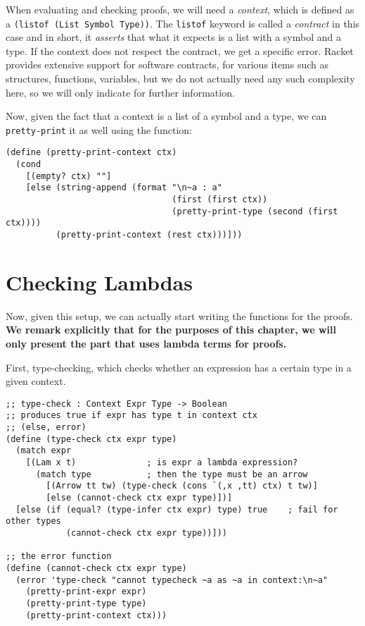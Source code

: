 When evaluating and checking proofs, we will need a \emph{context},
which is defined as a \texttt{(listof (List Symbol Type))}. The
\texttt{listof} keyword is called a \emph{contract} in this case and
in short, it \emph{asserts} that what it expects is a list with a
symbol and a type. If the context does not respect the contract,
we get a specific error. Racket provides extensive support for software
contracts, for various items such as structures, functions, variables,
but we do not actually need any such complexity here, so we will
only indicate \cite{contract} for further information.


Now, given the fact that a context is a list of a symbol and a type,
we can \texttt{pretty-print} it as well using the function:
{
  \small
\begin{verbatim}
(define (pretty-print-context ctx)
  (cond
    [(empty? ctx) ""]
    [else (string-append (format "\n~a : a"
                                 (first (first ctx))
                                 (pretty-print-type (second (first ctx))))
          (pretty-print-context (rest ctx)))]))
\end{verbatim}
}

\section{Checking Lambdas}

Now, given this setup, we can actually start writing the functions
for the proofs. \textbf{We remark explicitly that for the purposes %
  of this chapter, we will only present the part that uses lambda terms
  for proofs.}

First, type-checking, which checks whether an
expression has a certain type in a given context.
{
  \small
\begin{verbatim}
;; type-check : Context Expr Type -> Boolean
;; produces true if expr has type t in context ctx
;; (else, error)
(define (type-check ctx expr type)
  (match expr
    [(Lam x t)              ; is expr a lambda expression?
      (match type           ; then the type must be an arrow
        [(Arrow tt tw) (type-check (cons `(,x ,tt) ctx) t tw)]
        [else (cannot-check ctx expr type)])]
  [else (if (equal? (type-infer ctx expr) type) true    ; fail for other types
            (cannot-check ctx expr type))]))

;; the error function
(define (cannot-check ctx expr type)
  (error 'type-check "cannot typecheck ~a as ~a in context:\n~a"
    (pretty-print-expr expr)
    (pretty-print-type type)
    (pretty-print-context ctx)))
\end{verbatim}
}

